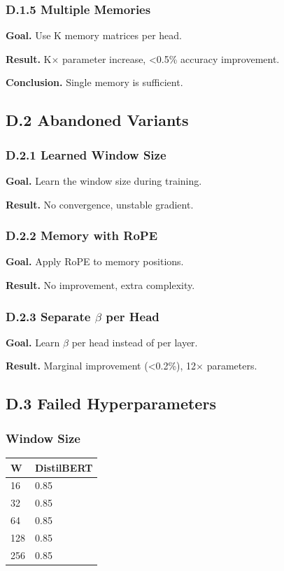 \subsubsection{D.1.5 Multiple Memories}

\textbf{Goal.} Use K memory matrices per head.

\textbf{Result.} K$\times$ parameter increase, \textless{}0.5\% accuracy improvement.

\textbf{Conclusion.} Single memory is sufficient.

\subsection{D.2 Abandoned Variants}

\subsubsection{D.2.1 Learned Window Size}

\textbf{Goal.} Learn the window size during training.

\textbf{Result.} No convergence, unstable gradient.

\subsubsection{D.2.2 Memory with RoPE}

\textbf{Goal.} Apply RoPE to memory positions.

\textbf{Result.} No improvement, extra complexity.

\subsubsection{D.2.3 Separate $\beta$ per Head}

\textbf{Goal.} Learn $\beta$ per head instead of per layer.

\textbf{Result.} Marginal improvement (\textless{}0.2\%), 12$\times$ parameters.

\subsection{D.3 Failed Hyperparameters}

\subsubsection{Window Size}

\begin{table}[H]
\centering
\small
\begin{tabular}{ll}
\toprule
\textbf{W} & \textbf{DistilBERT} \\
\midrule
16 & 0.85 \\
32 & 0.85 \\
64 & 0.85 \\
128 & 0.85 \\
256 & 0.85 \\
\bottomrule
\end{tabular}
\end{table}

